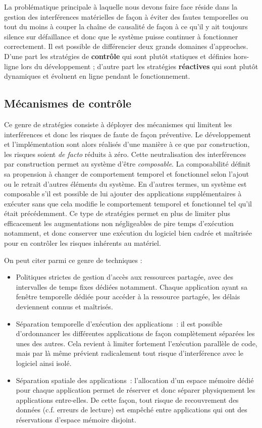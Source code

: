 \documentclass[french, a4paper, 11pt, twoside, pdftex]{StyleThese}
\begin{document}
	La problématique principale à laquelle nous devons faire face réside dans la gestion des interférences matérielles de façon à éviter des fautes temporelles ou tout du moins à couper la chaîne de causalité de façon à ce qu'il y ait toujours silence sur défaillance et donc que le système puisse continuer à fonctionner correctement. Il est possible de différencier deux grands domaines d'approches. D'une part les stratégies de \textbf{contrôle} qui sont plutôt statiques et définies hors-ligne lors du développement ; d'autre part les stratégies \textbf{réactives} qui sont plutôt dynamiques et évoluent en ligne pendant le fonctionnement.
	
	\subsection{Mécanismes de contrôle}
		Ce genre de stratégies consiste à déployer des mécanismes qui limitent les interférences et donc les risques de faute de façon préventive. Le développement et l'implémentation sont alors réalisés d'une manière à ce que par construction, les risques soient \textit{de facto} réduits à zéro. Cette neutralisation des interférences par construction permet au système d'être \textit{composable}. La composabilité définit sa propension à changer de comportement temporel et fonctionnel selon l'ajout ou le retrait d'autres éléments du système. En d'autres termes, un système est composable s'il est possible de lui ajouter des applications supplémentaires à exécuter sans que cela modifie le comportement temporel et fonctionnel tel qu'il était précédemment. 
		Ce type de stratégies permet en plus de limiter plus efficacement les augmentations non négligeables de pire temps d'exécution notamment, et donc conserver une exécution du logiciel bien cadrée et maîtrisée pour en contrôler les risques inhérents au matériel. 
		
		On peut citer parmi ce genre de techniques : 
		\begin{itemize}
			\item 			Politiques strictes de gestion d'accès aux ressources partagée, avec des intervalles de temps fixes dédiées notamment. Chaque application ayant sa fenêtre temporelle dédiée pour accéder à la ressource partagée, les délais deviennent connus et maîtrisés.
			\item 			Séparation temporelle d'exécution des applications~: il est possible d'ordonnancer les différentes applications de façon complètement séparées les unes des autres. Cela revient à limiter fortement l'exécution parallèle de code, mais par là même prévient radicalement tout risque d'interférence avec le logiciel ainsi isolé.
			\item 			Séparation spatiale des applications~: l'allocation d'un espace mémoire dédié pour chaque application permet de réserver et donc séparer physiquement les applications entre-elles. De cette façon, tout risque de recouvrement des données (c.f. erreurs de lecture) est empêché entre applications qui ont des réservations d'espace mémoire disjoint.
		\end{itemize}
		
\end{document}
